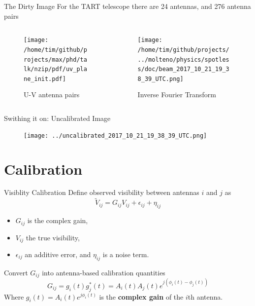 \documentclass[ignorenonframetext]{beamer}
\begin{document}
\begin{frame}{The Dirty Image}
For the TART telescope there are 24 antennas, 
and 276 antenna pairs
\begin{columns}
 \begin{column}{0.5\textwidth}
 \begin{figure}
\texttt{[image: /home/tim/github/projects/max/phd/talk/nzip/pdf/uv\_plane\_init.pdf]}
\caption{U-V antenna pairs}
 \end{figure}
 \end{column}
 \begin{column}{0.5\textwidth}
 \begin{figure}
 \texttt{[image: /home/tim/github/projects/../molteno/physics/spotless/doc/beam\_2017\_10\_21\_19\_38\_39\_UTC.png]}
\caption{Inverse Fourier Transform}
 \end{figure}
 \end{column}
\end{columns}

\end{frame}


\begin{frame}{Swithing it on: Uncalibrated Image}
\begin{figure}
\texttt{[image: ../uncalibrated\_2017\_10\_21\_19\_38\_39\_UTC.png]} 
\end{figure}
\end{frame}


\section{Calibration}

\frame{\tableofcontents[currentsection]}

\begin{frame}{Visiblity Calibration}
Define observed visibility between antennas $i$ and $j$ as
\[ \widetilde{V}_{ij} = G_{ij} V_{ij} + \epsilon_{ij} + \eta_{ij} \]
\begin{itemize}
 \item $G_{ij}$ is the complex gain, 
 \item $V_{ij}$ the true visibility, 
 \item $\epsilon_{ij}$ an additive error, and $\eta_{ij}$ is a noise term.
\end{itemize}
Convert $G_{ij}$ into antenna-based calibration quantities
\[ {G}_{ij} = g_{i}(t) g^{*}_{j}(t) = A_i(t)A_j(t) e^{j(\phi_i(t)-\phi_j(t))} \]
Where $g_i(t) = A_i(t) e^{j \phi_i(t)}$ is the {\bf complex gain} of the $i$th antenna.
\end{frame}
\end{document}
